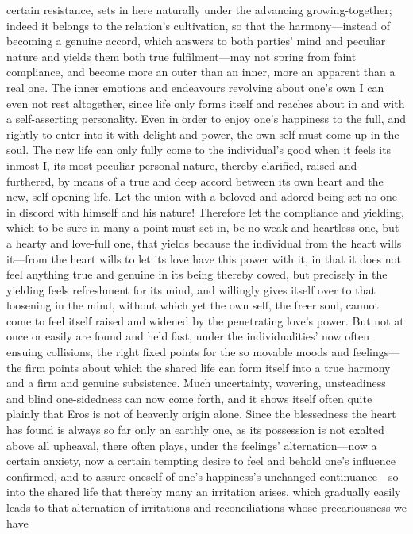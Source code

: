 \documentclass[12pt,a4paper]{book}
\begin{document}
certain resistance, sets in here naturally under the advancing
growing-together; indeed it belongs to the relation's cultivation, so that
the harmony---instead of becoming a genuine accord, which answers to both
parties' mind and peculiar nature and yields them both true fulfilment---may
not spring from faint compliance, and become more an outer than an inner,
more an apparent than a real one. The inner emotions and endeavours
revolving about one's own I can even not rest altogether, since life only
forms itself and reaches about in and with a self-asserting personality.
Even in order to enjoy one's happiness to the full, and rightly to enter
into it with delight and power, the own self must come up in the soul. The
new life can only fully come to the individual's good when it feels its
inmost I, its most peculiar personal nature, thereby clarified, raised and
furthered, by means of a true and deep accord between its own heart and the
new, self-opening life. Let the union with a beloved and adored being set
no one in discord with himself and his nature! Therefore let the compliance
and yielding, which to be sure in many a point must set in, be no weak and
heartless one, but a hearty and love-full one, that yields because the
individual from the heart wills it---from the heart wills to let its love
have this power with it, in that it does not feel anything true and genuine
in its being thereby cowed, but precisely in the yielding feels refreshment
for its mind, and willingly gives itself over to that loosening in the
mind, without which yet the own self, the freer soul, cannot come to feel
itself raised and widened by the penetrating love's power. But not at once
or easily are found and held fast, under the individualities' now often
ensuing collisions, the right fixed points for the so movable moods and
feelings---the firm points about which the shared life can form itself into
a true harmony and a firm and genuine subsistence. Much uncertainty,
wavering, unsteadiness and blind one-sidedness can now come forth, and it
shows itself often quite plainly that Eros is not of heavenly origin alone.
Since the blessedness the heart has found is always so far only an earthly
one, as its possession is not exalted above all upheaval, there often plays,
under the feelings' alternation---now a certain anxiety, now a certain
tempting desire to feel and behold one's influence confirmed, and to assure
oneself of one's happiness's unchanged continuance---so into the shared life
that thereby many an irritation arises, which gradually easily leads to that
alternation of irritations and reconciliations whose precariousness we have
\end{document}
